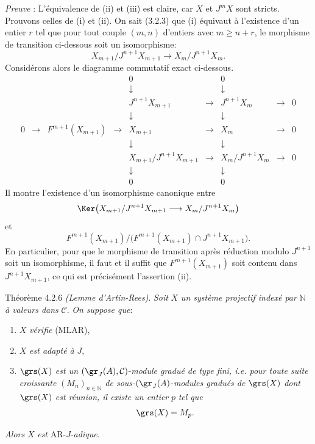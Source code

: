 \emph{Preuve} : L'équivalence de (ii) et (iii) est claire, car \(X\) et \(J^mX\) sont stricts. Prouvons celles de (i) et (ii). On sait (3.2.3) que (i) équivaut à l'existence d'un entier \(r\) tel que pour tout couple \((m,n)\) d'entiers avec \(m\ge n+r\), le morphisme de transition ci-dessous soit un isomorphisme:
\[
X_{m+1}/J^{n+1}X_{m+1}\longrightarrow X_m/J^{n+1}X_m.
\]
Considérons alors le diagramme commutatif exact ci-dessous.
\[
\begin{array}{ccccccccccc}
&&&&0&&0\\
&&&&\downarrow&&\downarrow\\
&&&&J^{n+1}X_{m+1}&\longrightarrow&J^{n+1}X_m&\longrightarrow&0\\
&&&&\downarrow&&\downarrow\\
0&\longrightarrow&F^{m+1}(X_{m+1})&\longrightarrow&X_{m+1}&\longrightarrow&X_m&\longrightarrow&0\\
&&&&\downarrow&&\downarrow\\
&&&&X_{m+1}/J^{n+1}X_{m+1}&\longrightarrow&X_m/J^{n+1}X_m&\longrightarrow&0\\
&&&&\downarrow&&\downarrow\\
&&&&0&&0
\end{array}
\]
Il
montre l'existence d'un isomorphisme canonique entre
\[
\Ker\bigl(X_{m+1}/J^{n+1}X_{m+1}
       \longrightarrow X_m/J^{n+1}X_m\bigr)
\]
et
\[
F^{m+1}(X_{m+1})/
\bigl(F^{m+1}(X_{m+1})\cap J^{n+1}X_{m+1}\bigr).
\]
En particulier, pour que le morphisme de transition après réduction modulo \(J^{n+1}\) soit un isomorphisme, il faut et il suffit que \(F^{m+1}(X_{m+1})\) soit contenu dans \(J^{n+1}X_{m+1}\), ce qui est précisément l'assertion (ii).

\begin{statement}{Théorème 4.2.6}
\emph{(Lemme d'Artin-Rees)}. \emph{Soit} \(X\) \emph{un système projectif indexé par} \(\mathbb{N}\) \emph{à valeurs dans} \(\mathcal{C}\). \emph{On suppose que}:
\begin{enumerate}[label=\textup{(\roman*)}]
\item \(X\) \emph{vérifie} (MLAR),
\item \(X\) \emph{est adapté à} \(J\),
\item \(\grs(X)\) \emph{est un} \((\gr_J(A),\mathcal{C})\)-\emph{module gradué de type fini, i.e. pour toute suite croissante} \((M_n)_{n\in\mathbb{N}}\) \emph{de sous-}\((\gr_J(A)\)-\emph{modules gradués de} \(\grs(X)\) \emph{dont} \(\grs(X)\) \emph{est réunion, il existe un entier} \(p\) \emph{tel que}
\[
\grs(X)=M_p.
\]
\end{enumerate}
\emph{Alors} \(X\) \emph{est} AR-\(J\)-\emph{adique.}
\end{statement}

